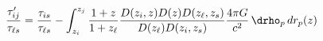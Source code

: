 \begin{equation}
  \frac{\tau'_{i j}}{\tau_{\ell s}} = \frac{\tau_{i s}}{\tau_{\ell s}} - \int_{z_i}^{z_j} \frac{1+z}{1+z_\ell} \frac{D(z_i,z) D(z) D(z_\ell,z_s)}{D(z_\ell) D(z_i,z_s)} \frac{4\pi G}{c^2}\,\drho_p\,dr_p(z)
\end{equation}